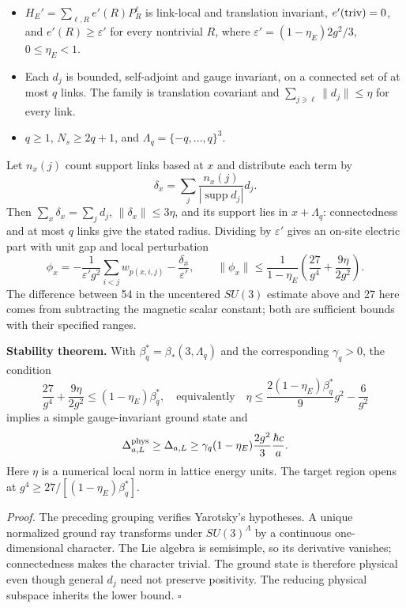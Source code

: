 \documentclass[11pt,a4paper]{article}
\newcommand{\tightlist}{\setlength{\itemsep}{0pt}\setlength{\parskip}{0pt}}
\begin{document}
\begin{itemize}
\tightlist
\item
  \(H_E'=\sum_{\ell,R}e'(R)P_R^\ell\) is link-local and translation
  invariant, \(e'({\rm triv})=0\), and \(e'(R)\ge\varepsilon'\) for
  every nontrivial \(R\), where \(\varepsilon'=(1-\eta_E)2g^2/3\),
  \(0\le\eta_E<1\).
\item
  Each \(d_j\) is bounded, self-adjoint and gauge invariant, on a
  connected set of at most \(q\) links. The family is translation
  covariant and \(\sum_{j\ni\ell}\|d_j\|\le\eta\) for every link.
\item
  \(q\ge1\), \(N_s\ge2q+1\), and \(\Lambda_q=\{-q,\ldots,q\}^3\).
\end{itemize}

Let \(n_x(j)\) count support links based at \(x\) and distribute each
term by \[\delta_x=\sum_j\frac{n_x(j)}{|\operatorname{supp}d_j|}d_j.\]
Then \(\sum_x\delta_x=\sum_jd_j\), \(\|\delta_x\|\le3\eta\), and its
support lies in \(x+\Lambda_q\): connectedness and at most \(q\) links
give the stated radius. Dividing by \(\varepsilon'\) gives an on-site
electric part with unit gap and local perturbation
\[\phi_x=-\frac1{\varepsilon'g^2}\sum_{i<j}w_{p(x,i,j)}
 -\frac{\delta_x}{\varepsilon'},\qquad
 \|\phi_x\|\le\frac1{1-\eta_E}
 \left(\frac{27}{g^4}+\frac{9\eta}{2g^2}\right).\] The difference
between 54 in the uncentered \(SU(3)\) estimate above and 27 here comes
from subtracting the magnetic scalar constant; both are sufficient
bounds with their specified ranges.

\textbf{Stability theorem.} With \(\beta_q^*=\beta_*(3,\Lambda_q)\) and
the corresponding \(\gamma_q>0\), the condition
\[\frac{27}{g^4}+\frac{9\eta}{2g^2}\le(1-\eta_E)\beta_q^*,
\quad\text{equivalently}\quad
 \eta\le\frac{2(1-\eta_E)\beta_q^*}{9}g^2-\frac6{g^2}\] implies a simple
gauge-invariant ground state and
\[\Delta^{\rm phys}_{a,L}\ge\Delta_{a,L}
 \ge\gamma_q(1-\eta_E)\frac{2g^2}{3}\frac{\hbar c}{a}.\] Here \(\eta\)
is a numerical local norm in lattice energy units. The target region
opens at \(g^4\ge27/[(1-\eta_E)\beta_q^*]\).

\emph{Proof.} The preceding grouping verifies Yarotsky's hypotheses. A
unique normalized ground ray transforms under \(SU(3)^\Lambda\) by a
continuous one-dimensional character. The Lie algebra is semisimple, so
its derivative vanishes; connectedness makes the character trivial. The
ground state is therefore physical even though general \(d_j\) need not
preserve positivity. The reducing physical subspace inherits the lower
bound. \(\square\)
\end{document}
